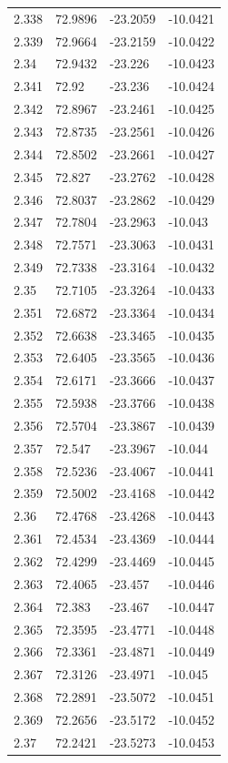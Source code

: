 \begin{tabular}{llll}
2.338 & 72.9896 & -23.2059 & -10.0421 \\
2.339 & 72.9664 & -23.2159 & -10.0422 \\
2.34 & 72.9432 & -23.226 & -10.0423 \\
2.341 & 72.92 & -23.236 & -10.0424 \\
2.342 & 72.8967 & -23.2461 & -10.0425 \\
2.343 & 72.8735 & -23.2561 & -10.0426 \\
2.344 & 72.8502 & -23.2661 & -10.0427 \\
2.345 & 72.827 & -23.2762 & -10.0428 \\
2.346 & 72.8037 & -23.2862 & -10.0429 \\
2.347 & 72.7804 & -23.2963 & -10.043 \\
2.348 & 72.7571 & -23.3063 & -10.0431 \\
2.349 & 72.7338 & -23.3164 & -10.0432 \\
2.35 & 72.7105 & -23.3264 & -10.0433 \\
2.351 & 72.6872 & -23.3364 & -10.0434 \\
2.352 & 72.6638 & -23.3465 & -10.0435 \\
2.353 & 72.6405 & -23.3565 & -10.0436 \\
2.354 & 72.6171 & -23.3666 & -10.0437 \\
2.355 & 72.5938 & -23.3766 & -10.0438 \\
2.356 & 72.5704 & -23.3867 & -10.0439 \\
2.357 & 72.547 & -23.3967 & -10.044 \\
2.358 & 72.5236 & -23.4067 & -10.0441 \\
2.359 & 72.5002 & -23.4168 & -10.0442 \\
2.36 & 72.4768 & -23.4268 & -10.0443 \\
2.361 & 72.4534 & -23.4369 & -10.0444 \\
2.362 & 72.4299 & -23.4469 & -10.0445 \\
2.363 & 72.4065 & -23.457 & -10.0446 \\
2.364 & 72.383 & -23.467 & -10.0447 \\
2.365 & 72.3595 & -23.4771 & -10.0448 \\
2.366 & 72.3361 & -23.4871 & -10.0449 \\
2.367 & 72.3126 & -23.4971 & -10.045 \\
2.368 & 72.2891 & -23.5072 & -10.0451 \\
2.369 & 72.2656 & -23.5172 & -10.0452 \\
2.37 & 72.2421 & -23.5273 & -10.0453 \\

\end{tabular}
